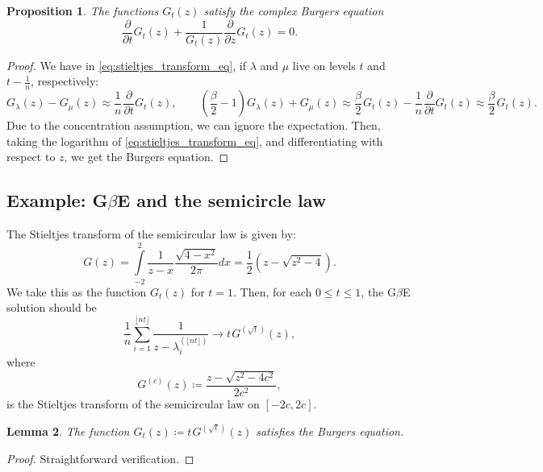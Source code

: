 \documentclass[letterpaper,11pt,oneside,reqno]{article}
\numberwithin{equation}{section}
\newcommand{\ssp}{\hspace{1pt}}
\newtheorem{proposition}{Proposition}[section]
\newtheorem{lemma}[proposition]{Lemma}
\theoremstyle{definition}
\begin{document}
\begin{proposition}
	The functions $G_t(z)$ satisfy the complex Burgers equation
	\begin{equation*}
		\frac{\partial}{\partial t}G_t(z) +
		\frac{1}{G_t(z)}\frac{\partial}{\partial z}G_t(z) = 0.
	\end{equation*}
\end{proposition}
\begin{proof}
	We have in \eqref{eq:stieltjes_transform_eq},
	if $\lambda$ and $\mu$ live on levels $t$ and $t-\frac{1}{n}$,
	respectively:
	\begin{equation*}
		G_\lambda(z)-G_\mu(z)\approx
		\frac{1}{n}\ssp\frac{\partial}{\partial t}G_t(z),
		\qquad
		\left( \frac{\beta}{2}-1 \right)G_\lambda(z) + G_\mu(z) \approx
		\frac{\beta}{2}\ssp G_t(z) - \frac{1}{n}\ssp\frac{\partial}{\partial t}G_t(z)
		\approx
		\frac{\beta}{2}\ssp G_t(z) .
	\end{equation*}
	Due to the concentration assumption, we can ignore the expectation.
	Then, taking the logarithm of \eqref{eq:stieltjes_transform_eq},
	and differentiating with respect to $z$,
	we get the Burgers equation.
\end{proof}

\subsection{Example: G$\beta$E and the semicircle law}

The Stieltjes transform of the semicircular law is given by:
\begin{equation*}
	G(z) = \int\limits_{-2}^{2}\frac{1}{z-x}\frac{\sqrt{4-x^2}}{2\pi}dx =
	\frac{1}{2} \left(z-\sqrt{z^2-4}\right).
\end{equation*}
We take this as the function $G_t(z)$ for $t=1$.
Then, for each $0\le t\le 1$, the
G$\beta$E solution should be
\begin{equation*}
	\frac{1}{n}\sum_{i=1}^{\lfloor nt \rfloor }\frac{1}{z-\lambda_i^{(\lfloor nt \rfloor )}}
	\to t\ssp G^{(\sqrt t)}(z),
\end{equation*}
where
\begin{equation*}
	G^{(c)}(z) \coloneqq \frac{z-\sqrt{z^2-4c^2}}{2c^2},
\end{equation*}
is the Stieltjes transform of the semicircular law on $[-2c, 2c]$.

\begin{lemma}
	\label{lemma:semicircle_and_burgers}
	The function $G_t(z)\coloneqq t\ssp G^{(\sqrt t)}(z)$
	satisfies the Burgers equation.
\end{lemma}
\begin{proof}
	Straightforward verification.
\end{proof}
\end{document}
